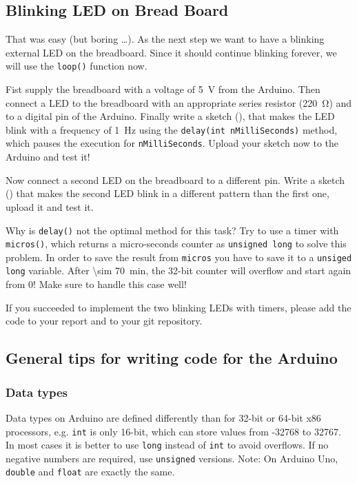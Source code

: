 \subsection{Blinking LED on Bread Board}\label{sec:led}
That was easy (but boring \ldots). As the next step we want to have a blinking external LED on the breadboard. Since it should continue blinking forever, we will use the \texttt{loop()} function now.
%

\begin{task}
  Fist supply the breadboard with a voltage of \SI{5}{\V} from the Arduino. Then connect a LED to the breadboard with an appropriate series resistor (\SI{220}{\ohm}) and to a digital pin of the Arduino. Finally write a sketch (), that makes the LED blink with a frequency of \SI{1}{\Hz} using the \texttt{delay(int nMilliSeconds)} method, which pauses the execution for \texttt{nMilliSeconds}. Upload your sketch now to the Arduino and test it!
\end{task}
%
\begin{task}\label{tsk:bla}
  Now connect a second LED on the breadboard to a different pin. Write a sketch () that makes the second LED blink in a different pattern than the first one, upload it and test it.
\end{task}
%
Why is \texttt{delay()} not the optimal method for this task? Try to use a timer with \texttt{micros()}, which returns a micro-seconds counter as \texttt{unsigned long} to solve this problem. In order to save the result from \texttt{micros} you have to save it to a \texttt{unsiged long} variable. After \SI{\sim 70}{\minute}, the 32-bit counter will overflow and start again from 0! Make sure to handle this case well!
%
\begin{task}
  If you succeeded to implement the two blinking LEDs with timers, please add the code to your report and to your git repository.
\end{task}
%
\subsection{General tips for writing code for the Arduino}\label{sec:codestyle}
%
\subsubsection{Data types}
Data types on Arduino are defined differently than for 32-bit or 64-bit x86 processors, e.g. \texttt{int} is only 16-bit, which can store values from -32768 to 32767. In most cases it is better to use \texttt{long} instead of \texttt{int} to avoid overflows. If no negative numbers are required, use \texttt{unsigned} versions. Note: On Arduino Uno, \texttt{double} and \texttt{float} are exactly the same.

